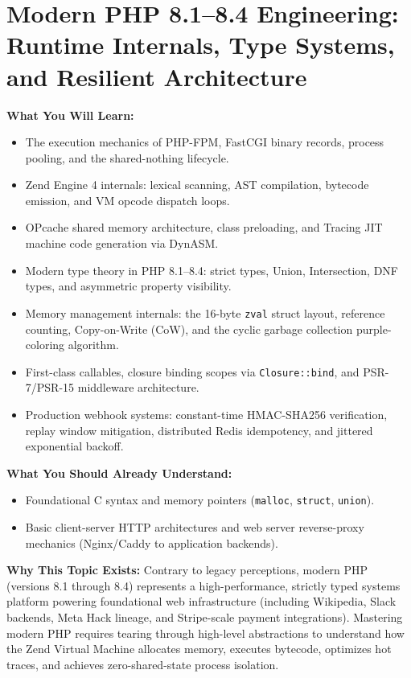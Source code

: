 \chapter{Modern PHP 8.1--8.4 Engineering: Runtime Internals, Type Systems, and Resilient Architecture}
\label{chap:modern-php}

\begin{chaptergoalsbox}
\textbf{What You Will Learn:}
\begin{itemize}[leftmargin=12pt,itemsep=2pt]
  \item The execution mechanics of PHP-FPM, FastCGI binary records, process pooling, and the shared-nothing lifecycle.
  \item Zend Engine 4 internals: lexical scanning, AST compilation, bytecode emission, and VM opcode dispatch loops.
  \item OPcache shared memory architecture, class preloading, and Tracing JIT machine code generation via DynASM.
  \item Modern type theory in PHP 8.1--8.4: strict types, Union, Intersection, DNF types, and asymmetric property visibility.
  \item Memory management internals: the 16-byte \texttt{zval} struct layout, reference counting, Copy-on-Write (CoW), and the cyclic garbage collection purple-coloring algorithm.
  \item First-class callables, closure binding scopes via \texttt{Closure::bind}, and PSR-7/PSR-15 middleware architecture.
  \item Production webhook systems: constant-time HMAC-SHA256 verification, replay window mitigation, distributed Redis idempotency, and jittered exponential backoff.
\end{itemize}

\textbf{What You Should Already Understand:}
\begin{itemize}[leftmargin=12pt,itemsep=2pt]
  \item Foundational C syntax and memory pointers (\texttt{malloc}, \texttt{struct}, \texttt{union}).
  \item Basic client-server HTTP architectures and web server reverse-proxy mechanics (Nginx/Caddy to application backends).
\end{itemize}

\textbf{Why This Topic Exists:}
Contrary to legacy perceptions, modern PHP (versions 8.1 through 8.4) represents a high-performance, strictly typed systems platform powering foundational web infrastructure (including Wikipedia, Slack backends, Meta Hack lineage, and Stripe-scale payment integrations). Mastering modern PHP requires tearing through high-level abstractions to understand how the Zend Virtual Machine allocates memory, executes bytecode, optimizes hot traces, and achieves zero-shared-state process isolation.


\end{chaptergoalsbox}
